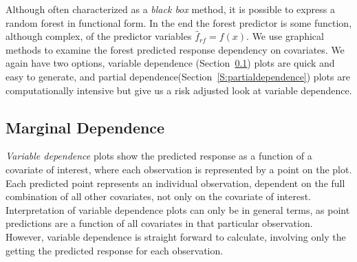 \documentclass[nojss]{jss}\usepackage[]{graphicx}\usepackage[]{color}
\begin{document}
Although often characterized as a \emph{black box} method, it is possible to express a random forest in functional form. In the end the forest predictor is some function, although complex, of the predictor variables $\hat{f}_{rf} = f(x).$ We use graphical methods to examine the forest predicted response dependency on covariates. We again have two options, variable dependence (Section~\ref{S:variabledependence}) plots are quick and easy to generate, and partial dependence(Section~\ref{S:partialdependence}) plots are computationally intensive but give us a risk adjusted look at variable dependence. 

\subsection{Marginal Dependence}\label{S:variabledependence}

\emph{Variable dependence} plots show the predicted response as a function of a covariate of interest, where each observation is represented by a point on the plot. Each predicted point represents an individual observation, dependent on the full combination of all other covariates, not only on the covariate of interest. Interpretation of variable dependence plots can only be in general terms, as point predictions are a function of all covariates in that particular observation. However, variable dependence is straight forward to calculate, involving only the getting the predicted response for each observation.
\end{document}
